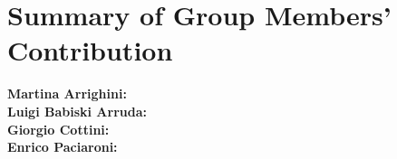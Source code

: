 \documentclass[12pt, openright, oneside]{report}
\begin{document}
\chapter{Summary of Group Members' Contribution}

\textbf{Martina Arrighini:}\\
\textbf{Luigi Babiski Arruda:}\\ 
\textbf{Giorgio Cottini:}\\
\textbf{Enrico Paciaroni:}\\

\end{document}
